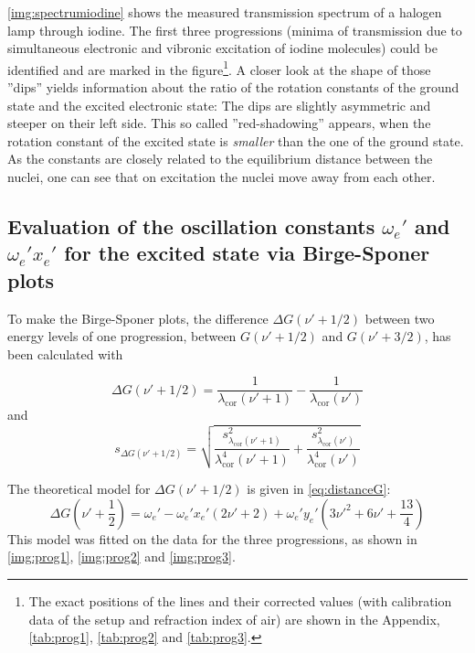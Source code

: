 \autoref{img:spectrumiodine} shows the measured transmission spectrum of a halogen lamp through iodine.
The first three progressions
(minima of transmission due to simultaneous electronic and vibronic excitation of iodine molecules)
could be identified and are marked in the
figure\footnote{The exact positions of the lines and
their corrected values (with calibration data of the setup and refraction index of air)
are shown in the Appendix, \autoref{tab:prog1}, \autoref{tab:prog2} and \autoref{tab:prog3}.}.
A closer look at the shape of those ''dips'' yields information about the ratio of the rotation constants
of the ground state and the excited electronic state:
The dips are slightly asymmetric and steeper on their left side. This so called
''red-shadowing'' appears, when the rotation constant of the excited state is \emph{smaller} than
the one of the ground state. As the constants are closely related to the equilibrium distance between the nuclei,
one can see that on excitation the nuclei move away from each other.



\subsection{Evaluation of the oscillation constants $\omega_e'$ and $\omega_e' x_e'$ for the excited state
via Birge-Sponer plots}
To make the Birge-Sponer plots,
the difference $\Delta G(\nu' +1/2)$ between two energy levels of one progression,
between $G(\nu' +1/2)$ and  $G(\nu' +3/2)$,
has been calculated with

\begin{equation}
  \Delta G(\nu' +1/2)=\frac{1}{\lambda_{\text{cor}}(\nu'+1)}-\frac{1}{\lambda_{\text{cor}}(\nu')}
\end{equation}
and
\begin{equation}
  s_{\Delta G(\nu' +1/2)}=
  \sqrt{\frac{s^2_{\lambda_{\text{cor}}(\nu'+1)}}{\lambda^4_{\text{cor}}(\nu'+1)}+
  \frac{s^2_{\lambda_{\text{cor}}(\nu')}}{\lambda^4_{\text{cor}}(\nu')}}
\end{equation}

The theoretical model for $\Delta G(\nu' +1/2)$ is given in \autoref{eq:distanceG}:
\begin{equation}
  \Delta G(\nu' + \frac{1}{2})=\omega_e' - \omega_e' x_e'(2\nu'+2) + \omega_e' y_e'(3\nu'^2 + 6 \nu' +\frac{13}{4})
\end{equation}
This model was fitted on the data for the three progressions, as shown in \autoref{img:prog1},
\autoref{img:prog2} and \autoref{img:prog3}.

